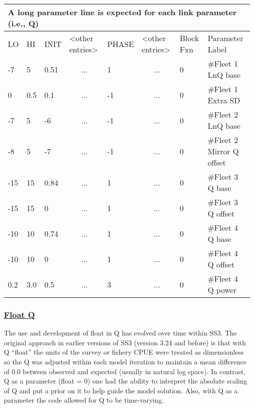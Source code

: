 \begin{longtable}{p{1cm} p{1cm} p{1cm} p{1.5cm} p{1.5cm} p{1.5cm} p{1.75cm} p{4cm}}
	\multicolumn{8}{l}{A long parameter line is expected for each link parameter (i.e., Q)} \\
	\hline
	LO \Tstrut & HI & INIT & <other entries> & PHASE & <other entries> & Block Fxn & Parameter Label \Bstrut\\
	\hline
	-7  & 5   & 0.51 & \multicolumn{1}{c}{...} &  1 & \multicolumn{1}{c}{...} & 0 & \#Fleet 1 LnQ base \Tstrut\\
	 0  & 0.5 & 0.1  & \multicolumn{1}{c}{...} & -1 & \multicolumn{1}{c}{...} & 0 & \#Fleet 1 Extra SD \\
	-7  & 5   & -6   & \multicolumn{1}{c}{...} & -1 & \multicolumn{1}{c}{...} & 0 & \#Fleet 2 LnQ base \\
	-8  & 5   & -7   & \multicolumn{1}{c}{...} & -1 & \multicolumn{1}{c}{...} & 0 & \#Fleet 2 Mirror Q offset \\
	-15 & 15  & 0.84 & \multicolumn{1}{c}{...} &  1 & \multicolumn{1}{c}{...} & 0 & \#Fleet 3 Q base \\
    -15 & 15  & 0    & \multicolumn{1}{c}{...} &  1 & \multicolumn{1}{c}{...} & 0 & \#Fleet 3 Q offset \\
	-10 & 10  & 0.74 & \multicolumn{1}{c}{...} &  1 & \multicolumn{1}{c}{...} & 0 & \#Fleet 4 Q base \\
    -10 & 10  & 0    & \multicolumn{1}{c}{...} &  1 & \multicolumn{1}{c}{...} & 0 & \#Fleet 4 Q offset \\
    0.2 & 3.0 & 0.5  & \multicolumn{1}{c}{...} &  3 & \multicolumn{1}{c}{...} & 0 & \#Fleet 4 Q power \Bstrut\\
	\hline
\end{longtable}

\hypertarget{FloatQ}{}
\subsubsection[Float Q]{\protect\hyperlink{FloatQ}{Float Q}}
The use and development of float in Q has evolved over time within SS3. The original approach in earlier versions of SS3 (version 3.24 and before) is that with Q ``float'' the units of the survey or fishery CPUE were treated as dimensionless so the Q was adjusted within each model iteration to maintain a mean difference of 0.0 between observed and expected (usually in natural log space). In contrast, Q as a parameter (float = 0) one had the ability to interpret the absolute scaling of Q and put a prior on it to help guide the model solution. Also, with Q as a parameter the code allowed for Q to be time-varying.


